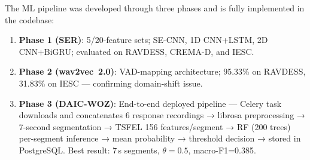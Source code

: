 The ML pipeline was developed through three phases and is fully implemented in the codebase:
\begin{enumerate}
    \item \textbf{Phase 1 (SER)}: 5/20-feature sets; SE-CNN, 1D CNN+LSTM, 2D CNN+BiGRU; evaluated on RAVDESS, CREMA-D, and IESC.
    \item \textbf{Phase 2 (wav2vec~2.0)}: VAD-mapping architecture; 95.33\% on RAVDESS, 31.83\% on IESC — confirming domain-shift issue.
    \item \textbf{Phase 3 (DAIC-WOZ)}: End-to-end deployed pipeline — Celery task downloads and concatenates 6 response recordings → librosa preprocessing → 7-second segmentation → TSFEL 156 features/segment → RF (200 trees) per-segment inference → mean probability → threshold decision → stored in PostgreSQL. Best result: 7\,s segments, $\theta=0.5$, macro-F1=0.385.
\end{enumerate}
